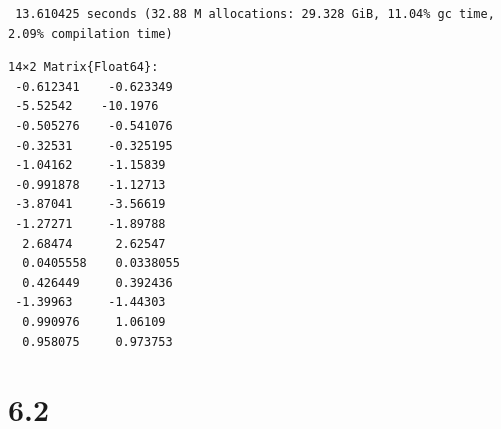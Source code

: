 \documentclass[
  letterpaper,
  DIV=11,
  numbers=noendperiod]{scrreprt}
\begin{document}
\begin{verbatim}
 13.610425 seconds (32.88 M allocations: 29.328 GiB, 11.04% gc time, 2.09% compilation time)
\end{verbatim}

\begin{verbatim}
14×2 Matrix{Float64}:
 -0.612341    -0.623349
 -5.52542    -10.1976
 -0.505276    -0.541076
 -0.32531     -0.325195
 -1.04162     -1.15839
 -0.991878    -1.12713
 -3.87041     -3.56619
 -1.27271     -1.89788
  2.68474      2.62547
  0.0405558    0.0338055
  0.426449     0.392436
 -1.39963     -1.44303
  0.990976     1.06109
  0.958075     0.973753
\end{verbatim}

\hypertarget{section-25}{%
\section{6.2}\label{section-25}}
\end{document}
